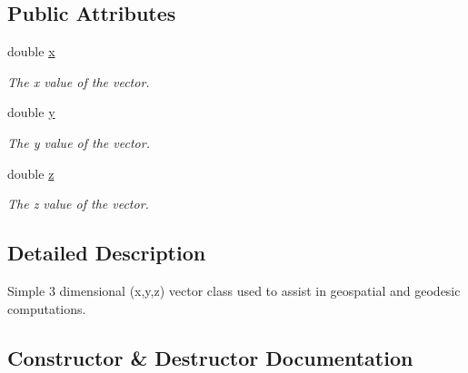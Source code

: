 \subsection*{Public Attributes}
\begin{DoxyCompactItemize}
\item 
double \hyperlink{structgeo_1_1Vector_a92d828b5095e1a99f159d043cc88ce3d}{x}\hypertarget{structgeo_1_1Vector_a92d828b5095e1a99f159d043cc88ce3d}{}\label{structgeo_1_1Vector_a92d828b5095e1a99f159d043cc88ce3d}

\begin{DoxyCompactList}\small\item\em The x value of the vector. \end{DoxyCompactList}\item 
double \hyperlink{structgeo_1_1Vector_ab21926c4f98eeb07d6ad19d1affdb906}{y}\hypertarget{structgeo_1_1Vector_ab21926c4f98eeb07d6ad19d1affdb906}{}\label{structgeo_1_1Vector_ab21926c4f98eeb07d6ad19d1affdb906}

\begin{DoxyCompactList}\small\item\em The y value of the vector. \end{DoxyCompactList}\item 
double \hyperlink{structgeo_1_1Vector_a27b88a7d57422a7609e011fe921ea500}{z}\hypertarget{structgeo_1_1Vector_a27b88a7d57422a7609e011fe921ea500}{}\label{structgeo_1_1Vector_a27b88a7d57422a7609e011fe921ea500}

\begin{DoxyCompactList}\small\item\em The z value of the vector. \end{DoxyCompactList}\end{DoxyCompactItemize}


\subsection{Detailed Description}
Simple 3 dimensional (x,y,z) vector class used to assist in geospatial and geodesic computations. 

\subsection{Constructor \& Destructor Documentation}
